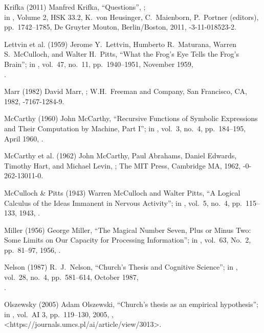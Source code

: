  Krifka (2011)
Manfred Krifka,
``Questions'',
;\\
in ,
 Volume 2, HSK 33.2,
 K.\ von Heusinger, C.\ Maienborn, P.\ Portner (editors),
pp.\ 1742--1785,
De Gruyter Mouton, Berlin/Boston, 2011,
-3-11-018523-2.

 Lettvin et al. (1959)
Jerome Y.\ Lettvin, Humberto R.\ Maturana,
Warren S.\ McCulloch, and Walter H.\ Pitts,
``What the Frog's Eye Tells the Frog's Brain'';
in ,
vol.\ 47, no.\ 11, pp.\ 1940--1951, November 1959,\\
.

 Marr (1982)
David Marr,
;
W.H.\ Freeman and Company, San Francisco, CA, 1982,
-7167-1284-9.

 McCarthy (1960)
John McCarthy,
``Recursive Functions of Symbolic Expressions
and Their Computation by Machine, Part I'';
in ,
vol.\ 3, no.\ 4, pp.\ 184--195, April 1960,
.

 McCarthy et al. (1962)
John McCarthy, Paul Abrahams, Daniel Edwards,
Timothy Hart, and Michael Levin,
 ;
The MIT Press, Cambridge MA, 1962,
-0-262-13011-0.

 McCulloch \& Pitts (1943)
Warren McCulloch and Walter Pitts,
``A Logical Calculus of the Ideas Immanent in Nervous Activity'';
in ,
vol.\ 5, no.\ 4, pp.\ 115--133, 1943,
.

 Miller (1956)
 George Miller,
``The Magical Number Seven, Plus or Minus Two:
Some Limits on Our Capacity for Processing Information'';
in ,
vol.\ 63, No.\ 2, pp.\ 81--97, 1956,
.

 Nelson (1987)
R.\ J.\ Nelson,
``Church's Thesis and Cognitive Science'';
in ,
vol.\ 28, no.\ 4, pp.\ 581--614, October 1987,\\
.

 Olszewsky (2005)
Adam Olszewski,
``Church's thesis as an empirical hypothesis'';
in ,
vol.\ AI 3, pp.\ 119--130, 2005,
,
\URL<https://journals.umcs.pl/ai/article/view/3013>.

